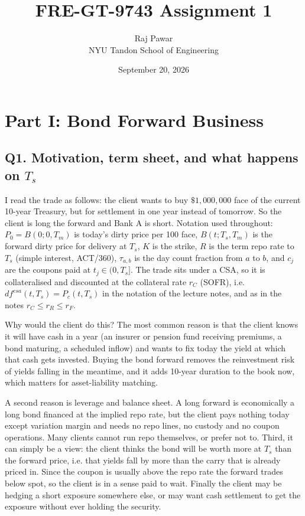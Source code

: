 \documentclass[11pt]{article}
\title{FRE-GT-9743 Assignment 1}
\author{Raj Pawar\\ NYU Tandon School of Engineering}
\date{September 20, 2026}
\begin{document}
\maketitle

\section*{Part I: Bond Forward Business}

\subsection*{Q1. Motivation, term sheet, and what happens on $T_s$}

I read the trade as follows: the client wants to buy $\$1{,}000{,}000$ face of the current 10-year Treasury, but for settlement in one year instead of tomorrow. So the client is long the forward and Bank A is short. Notation used throughout: $P_0 = B(0;0,T_m)$ is today's dirty price per 100 face, $B(t;T_s,T_m)$ is the forward dirty price for delivery at $T_s$, $K$ is the strike, $R$ is the term repo rate to $T_s$ (simple interest, ACT/360), $\tau_{a,b}$ is the day count fraction from $a$ to $b$, and $c_j$ are the coupons paid at $t_j \in (0,T_s]$. The trade sits under a CSA, so it is collateralised and discounted at the collateral rate $r_C$ (SOFR), i.e. $df^{csa}(t,T_s) = P_c(t,T_s)$ in the notation of the lecture notes, and as in the notes $r_C \le r_R \le r_F$.

Why would the client do this? The most common reason is that the client knows it will have cash in a year (an insurer or pension fund receiving premiums, a bond maturing, a scheduled inflow) and wants to fix today the yield at which that cash gets invested. Buying the bond forward removes the reinvestment risk of yields falling in the meantime, and it adds 10-year duration to the book now, which matters for asset-liability matching.

A second reason is leverage and balance sheet. A long forward is economically a long bond financed at the implied repo rate, but the client pays nothing today except variation margin and needs no repo lines, no custody and no coupon operations. Many clients cannot run repo themselves, or prefer not to. Third, it can simply be a view: the client thinks the bond will be worth more at $T_s$ than the forward price, i.e. that yields fall by more than the carry that is already priced in. Since the coupon is usually above the repo rate the forward trades below spot, so the client is in a sense paid to wait. Finally the client may be hedging a short exposure somewhere else, or may want cash settlement to get the exposure without ever holding the security.
\end{document}

